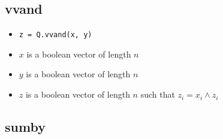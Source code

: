 \subsection{vvand}
\label{vvand}

\begin{itemize}
\item \verb+z = Q.vvand(x, y)+ 
\item \(x\) is a boolean vector of length \(n\)
\item \(y\) is a boolean vector of length \(n\)
\item \(z\) is a boolean vector of length \(n\) such that \(z_i = x_i \wedge z_i\)
\end{itemize}

\subsection{sumby}
\label{sumby}
